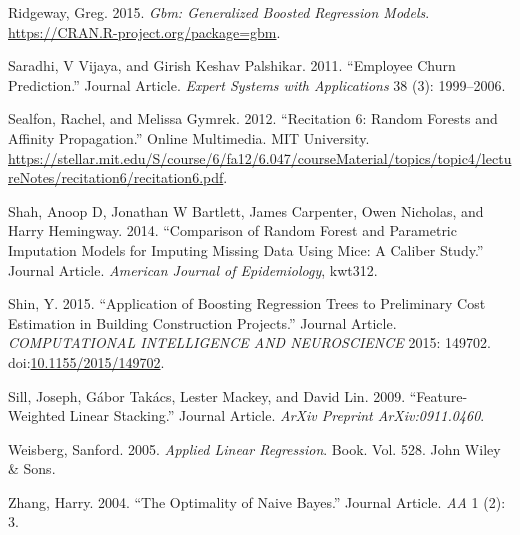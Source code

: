\documentclass[]{elsarticle} %
\begin{document}
\hypertarget{ref-gbm}{}
Ridgeway, Greg. 2015. \emph{Gbm: Generalized Boosted Regression Models}.
\url{https://CRAN.R-project.org/package=gbm}.

\hypertarget{ref-Saradhi2011}{}
Saradhi, V Vijaya, and Girish Keshav Palshikar. 2011. ``Employee Churn
Prediction.'' Journal Article. \emph{Expert Systems with Applications}
38 (3): 1999--2006.

\hypertarget{ref-Sealfon2012}{}
Sealfon, Rachel, and Melissa Gymrek. 2012. ``Recitation 6: Random
Forests and Affinity Propagation.'' Online Multimedia. MIT University.
\url{https://stellar.mit.edu/S/course/6/fa12/6.047/courseMaterial/topics/topic4/lectureNotes/recitation6/recitation6.pdf}.

\hypertarget{ref-Shah2014}{}
Shah, Anoop D, Jonathan W Bartlett, James Carpenter, Owen Nicholas, and
Harry Hemingway. 2014. ``Comparison of Random Forest and Parametric
Imputation Models for Imputing Missing Data Using Mice: A Caliber
Study.'' Journal Article. \emph{American Journal of Epidemiology},
kwt312.

\hypertarget{ref-Shin2015}{}
Shin, Y. 2015. ``Application of Boosting Regression Trees to Preliminary
Cost Estimation in Building Construction Projects.'' Journal Article.
\emph{COMPUTATIONAL INTELLIGENCE AND NEUROSCIENCE} 2015: 149702.
doi:\href{https://doi.org/10.1155/2015/149702}{10.1155/2015/149702}.

\hypertarget{ref-Sill2009}{}
Sill, Joseph, Gábor Takács, Lester Mackey, and David Lin. 2009.
``Feature-Weighted Linear Stacking.'' Journal Article. \emph{ArXiv
Preprint ArXiv:0911.0460}.

\hypertarget{ref-Weisberg2005}{}
Weisberg, Sanford. 2005. \emph{Applied Linear Regression}. Book. Vol.
528. John Wiley \& Sons.

\hypertarget{ref-Zhang2004}{}
Zhang, Harry. 2004. ``The Optimality of Naive Bayes.'' Journal Article.
\emph{AA} 1 (2): 3.
\end{document}

